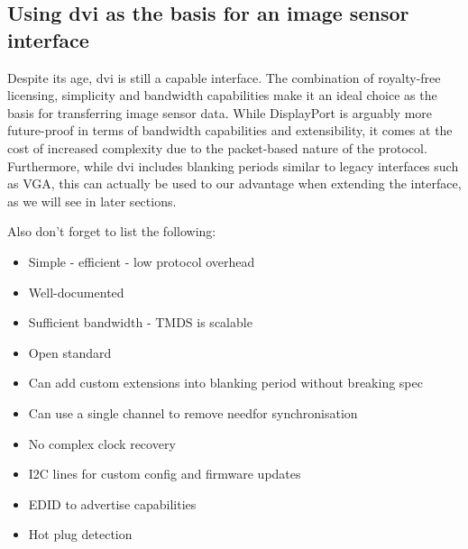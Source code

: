 \subsection{Using \gls{dvi} as the basis for an image sensor interface}
Despite its age, \gls{dvi} is still a capable interface. The combination of royalty-free licensing, simplicity and bandwidth capabilities make it an ideal choice as the basis for transferring image sensor data. While DisplayPort is arguably more future-proof in terms of bandwidth capabilities and extensibility, it comes at the cost of increased complexity due to the packet-based nature of the protocol. Furthermore, while \gls{dvi} includes blanking periods similar to legacy interfaces such as VGA, this can actually be used to our advantage when extending the interface, as we will see in later sections.

Also don't forget to list the following:

\begin{itemize}
  \item{Simple - efficient - low protocol overhead}
  \item{Well-documented}
  \item{Sufficient bandwidth - TMDS is scalable}
  \item{Open standard}
  \item{Can add custom extensions into blanking period without breaking spec}
  \item{Can use a single channel to remove needfor synchronisation}
  \item{No complex clock recovery}
  \item{I2C lines for custom config and firmware updates}
  \item{EDID to advertise capabilities}
  \item{Hot plug detection}
\end{itemize}